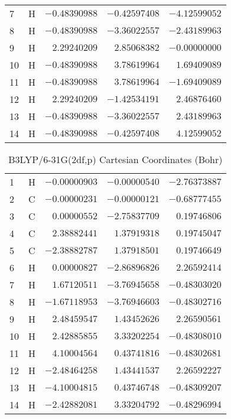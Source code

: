 \documentclass[10pt,oneside]{article}
\begin{document}
\begin{table}[h!]
\begin{multicols}{2}
\begin{tabular}{llrrr}
7  & H  & $-0.48390988$ & $-0.42597408$ & $-4.12599052$ \\
8  & H  & $-0.48390988$ & $-3.36022557$ & $-2.43189963$ \\
9  & H  & $ 2.29240209$ & $ 2.85068382$ & $-0.00000000$ \\
10 & H  & $-0.48390988$ & $ 3.78619964$ & $ 1.69409089$ \\
11 & H  & $-0.48390988$ & $ 3.78619964$ & $-1.69409089$ \\
12 & H  & $ 2.29240209$ & $-1.42534191$ & $ 2.46876460$ \\
13 & H  & $-0.48390988$ & $-3.36022557$ & $ 2.43189963$ \\
14 & H  & $-0.48390988$ & $-0.42597408$ & $ 4.12599052$ \\
\bottomrule
\end{tabular}
\end{multicols}
\end{table}

\begin{table}[h]
\centering
\caption{B3LYP/6-31G(2df,p) Cartesian Coordinates (Bohr)}
\begin{tabular}{llrrr}
\toprule
1  & H  & $-0.00000903$ & $-0.00000540$ & $-2.76373887$ \\
2  & C  & $-0.00000231$ & $-0.00000121$ & $-0.68777455$ \\
3  & C  & $ 0.00000552$ & $-2.75837709$ & $ 0.19746806$ \\
4  & C  & $ 2.38882441$ & $ 1.37919318$ & $ 0.19745047$ \\
5  & C  & $-2.38882787$ & $ 1.37918501$ & $ 0.19746649$ \\
6  & H  & $ 0.00000827$ & $-2.86896826$ & $ 2.26592414$ \\
7  & H  & $ 1.67120511$ & $-3.76945658$ & $-0.48303020$ \\
8  & H  & $-1.67118953$ & $-3.76946603$ & $-0.48302716$ \\
9  & H  & $ 2.48459547$ & $ 1.43452626$ & $ 2.26590561$ \\
10 & H  & $ 2.42885855$ & $ 3.33202254$ & $-0.48308010$ \\
11 & H  & $ 4.10004564$ & $ 0.43741816$ & $-0.48302681$ \\
12 & H  & $-2.48464258$ & $ 1.43441537$ & $ 2.26592227$ \\
13 & H  & $-4.10004815$ & $ 0.43746748$ & $-0.48309207$ \\
14 & H  & $-2.42882081$ & $ 3.33204792$ & $-0.48296994$ \\
\bottomrule
\end{tabular}
\end{table}
\end{document}
